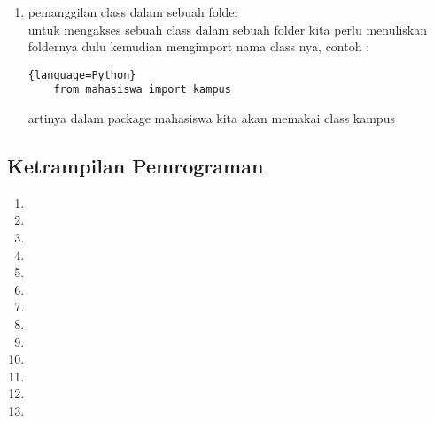 \begin{enumerate}
				\item pemanggilan class dalam sebuah folder\\
				untuk mengakses sebuah class dalam sebuah folder kita perlu menuliskan foldernya dulu kemudian mengimport nama class nya, contoh :
				\begin{lstlisting}{language=Python}
	from mahasiswa import kampus
				\end{lstlisting}
	artinya dalam package mahasiswa kita akan memakai class kampus
				
				\end{enumerate}
	
	    \newpage			
		\subsection{Ketrampilan Pemrograman}
				\begin{enumerate}
					\item 
					\item 
					\item 
					\item 
					\item 
					\item 
					\item 
					\item 
					\item 
					\item 
					\item 
					\item 
					\item 
		
	\end{enumerate}

